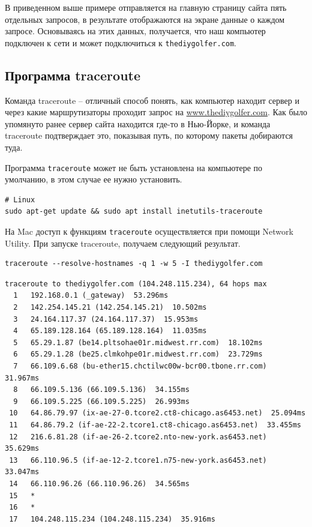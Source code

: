 \documentclass[a4paper,12pt,final,openany]{extbook}
\begin{document}
В приведенном выше примере отправляется на главную страницу сайта пять
отдельных запросов, в результате отображаются на экране данные о каждом запросе.
Основываясь на этих данных, получается, что наш компьютер подключен к
сети и может подключиться к \texttt{thediygolfer.com}.

\hypertarget{traceroute}{%
\subsection{\texorpdfstring{\protect\hyperlink{traceroute}{}Программа
traceroute}{Программа traceroute}}\label{traceroute}}

Команда traceroute -- отличный способ понять, как компьютер находит
сервер и через какие маршрутизаторы проходит запрос на
\href{http://www.thediygolfer.com}{www.thediygolfer.com}. Как было
упомянуто ранее сервер сайта находится где-то в Нью-Йорке, и команда
traceroute подтверждает это, показывая путь, по которому пакеты
добираются туда.

Программа \texttt{traceroute} может не быть установлена на компьютере по умолчанию, в этом
случае ее нужно установить.
\begin{verbatim}
# Linux
sudo apt-get update && sudo apt install inetutils-traceroute
\end{verbatim}

На Mac доступ к функциям \texttt{traceroute} осуществляется при помощи Network
Utility. При запуске traceroute, получаем следующий результат.
\begin{verbatim}
traceroute --resolve-hostnames -q 1 -w 5 -I thediygolfer.com
\end{verbatim}

\begin{verbatim}
traceroute to thediygolfer.com (104.248.115.234), 64 hops max
  1   192.168.0.1 (_gateway)  53.296ms
  2   142.254.145.21 (142.254.145.21)  10.502ms
  3   24.164.117.37 (24.164.117.37)  15.953ms
  4   65.189.128.164 (65.189.128.164)  11.035ms
  5   65.29.1.87 (be14.pltsohae01r.midwest.rr.com)  18.102ms
  6   65.29.1.28 (be25.clmkohpe01r.midwest.rr.com)  23.729ms
  7   66.109.6.68 (bu-ether15.chctilwc00w-bcr00.tbone.rr.com)  31.967ms
  8   66.109.5.136 (66.109.5.136)  34.155ms
  9   66.109.5.225 (66.109.5.225)  26.993ms
 10   64.86.79.97 (ix-ae-27-0.tcore2.ct8-chicago.as6453.net)  25.094ms
 11   64.86.79.2 (if-ae-22-2.tcore1.ct8-chicago.as6453.net)  33.455ms
 12   216.6.81.28 (if-ae-26-2.tcore2.nto-new-york.as6453.net)  35.629ms
 13   66.110.96.5 (if-ae-12-2.tcore1.n75-new-york.as6453.net)  33.047ms
 14   66.110.96.26 (66.110.96.26)  34.565ms
 15   *
 16   *
 17   104.248.115.234 (104.248.115.234)  35.916ms
\end{verbatim}
\end{document}

